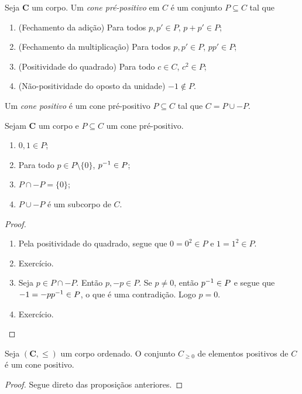 \begin{definition}
Seja $\bm C$ um corpo. Um \emph{cone pré-positivo} em $C$ é um conjunto $P \subseteq C$ tal que
	\begin{enumerate}
	\item (Fechamento da adição) Para todos $p,p' \in P$, $p+p' \in P$;
	\item (Fechamento da multiplicação) Para todos $p,p' \in P$, $pp' \in P$;
	\item (Positividade do quadrado) Para todo $c \in C$, $c^2 \in P$;
	\item (Não-positividade do oposto da unidade) $-1 \notin P$.
	\end{enumerate}

Um \emph{cone positivo} é um cone pré-positivo $P \subseteq C$ tal que $C = P \cup -P$.
\end{definition}

\begin{proposition}
Sejam $\bm C$ um corpo e $P \subseteq C$ um cone pré-positivo.
	\begin{enumerate}
	\item $0,1 \in P$;
	\item Para todo $p \in P \setminus \{0\}$, $p ^{-1} \in P$;
	\item $P \cap -P = \{0\}$;
	\item $P \cup -P$ é um subcorpo de $C$.
	\end{enumerate}
\end{proposition}
\begin{proof}
	\begin{enumerate}
	\item Pela positividade do quadrado, segue que $0=0^2 \in P$ e $1=1^2 \in P$.
	
	\item Exercício.%
	
	\item Seja $p \in P \cap -P$. Então $p,-p \in P$. Se $p \neq 0$, então $p^{-1} \in P$ e segue que $-1 = -pp^{-1} \in P$, o que é uma contradição. Logo $p=0$.
	
	\item Exercício.
	
	\end{enumerate}
\end{proof}

\begin{proposition}
Seja $(\bm C,\leq)$ um corpo ordenado. O conjunto $C_{\geq  0}$ de elementos positivos de $C$ é um cone positivo.
\end{proposition}
\begin{proof}
Segue direto das proposiçãos anteriores.
\end{proof}

